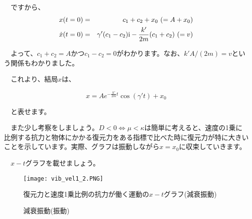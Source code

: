 \begin{enumerate}
            　ですから、
            　
            \begin{eqnarray}
                x(t=0) &=& c_1+c_2+x_0 \ (=A+x_0) \notag \\
                \dot{x}(t=0) &=& \gamma'(c_1-c_2)\mathrm{i}-\frac{k'}{2m}(c_1+c_2) \ (=v) \notag
            \end{eqnarray}
            
            　よって、$c_1+c_2=A$かつ$c_1-c_2=0$がわかります。なお、$k'A/(2m)=v$という関係もわかりました。
            
            　これより、結局$x$は、
            
            \begin{equation}
                x = Ae^{-\frac{k'}{2m}t}\cos(\gamma't)+ x_0
                \label{eq:decayvibration}
            \end{equation}
            
            　と表せます。
            
            　また少し考察をしましょう。$D < 0\Leftrightarrow \mu < \kappa$は簡単に考えると、速度の1乗に比例する抗力と物体にかかる復元力をある指標で比べた時に復元力が特に大きいことを示しています。実際、グラフは振動しながら$x=x_0$に収束していきます。
            
            　$x-t$グラフを載せましょう。
            \begin{figure}[!ht]
              \centering
              \texttt{[image: vib\_vel1\_2.PNG]}
              \caption{復元力と速度1乗比例の抗力が働く運動の$x-t$グラフ(減衰振動)}
              \label{fig:vib_vel1_2}
            \end{figure}
            \fi
            
            \begin{figure}[htbp]
            \begin{center}
            \caption{減衰振動(振動)}
            \end{center}
            \end{figure}
\end{enumerate}



